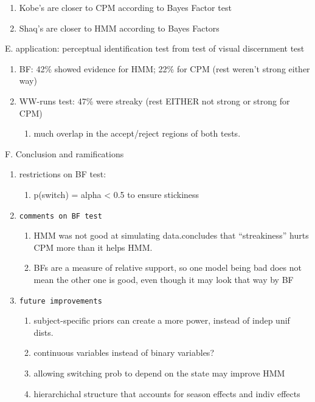 \documentclass[12pt,twoside]{dukestatscithesis}
\providecommand{\tightlist}{%
  \setlength{\itemsep}{0pt}\setlength{\parskip}{0pt}}
\theoremstyle{definition}
\theoremstyle{definition}
\theoremstyle{definition}
\theoremstyle{remark}
\begin{document}
\begin{enumerate}
\def\labelenumi{\arabic{enumi}.}
\tightlist
\item
  Kobe's are closer to CPM according to Bayes Factor test
\item
  Shaq's are closer to HMM according to Bayes Factors
\end{enumerate}
E. application: perceptual identification test from test of visual
discernment test
\begin{enumerate}
\def\labelenumi{\arabic{enumi}.}
\tightlist
\item
  BF: 42\% showed evidence for HMM; 22\% for CPM (rest weren't strong
  either way)
\item
  WW-runs test: 47\% were streaky (rest EITHER not strong or strong for
  CPM)
  \begin{enumerate}
  \def\labelenumii{\alph{enumii}.}
  \tightlist
  \item
    much overlap in the accept/reject regions of both tests.
  \end{enumerate}
\end{enumerate}
F. Conclusion and ramifications
\begin{enumerate}
\def\labelenumi{\arabic{enumi}.}
\item
  restrictions on BF test:
  \begin{enumerate}
  \def\labelenumii{\alph{enumii}.}
  \tightlist
  \item
    p(switch) = alpha \textless{} 0.5 to ensure stickiness
  \end{enumerate}
\item
\begin{verbatim}
comments on BF test
\end{verbatim}
  \begin{enumerate}
  \def\labelenumii{\alph{enumii}.}
  \tightlist
  \item
    HMM was not good at simulating data.concludes that ``streakiness''
    hurts CPM more than it helps HMM.
  \item
    BFs are a measure of relative support, so one model being bad does
    not mean the other one is good, even though it may look that way by
    BF
  \end{enumerate}
\item
\begin{verbatim}
future improvements
\end{verbatim}
  \begin{enumerate}
  \def\labelenumii{\alph{enumii}.}
  \tightlist
  \item
    subject-specific priors can create a more power, instead of indep
    unif dists.
  \item
    continuous variables instead of binary variables?
  \item
    allowing switching prob to depend on the state may improve HMM
  \item
    hierarchichal structure that accounts for season effects and indiv
    effects
  \end{enumerate}
\end{enumerate}
\end{document}
